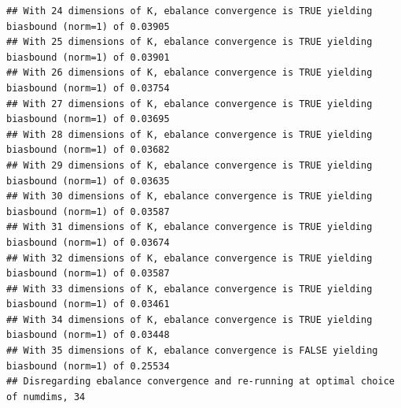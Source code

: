 \documentclass[
]{article}
\begin{document}
\begin{verbatim}
## With 24 dimensions of K, ebalance convergence is TRUE yielding biasbound (norm=1) of 0.03905  
## With 25 dimensions of K, ebalance convergence is TRUE yielding biasbound (norm=1) of 0.03901  
## With 26 dimensions of K, ebalance convergence is TRUE yielding biasbound (norm=1) of 0.03754  
## With 27 dimensions of K, ebalance convergence is TRUE yielding biasbound (norm=1) of 0.03695  
## With 28 dimensions of K, ebalance convergence is TRUE yielding biasbound (norm=1) of 0.03682  
## With 29 dimensions of K, ebalance convergence is TRUE yielding biasbound (norm=1) of 0.03635  
## With 30 dimensions of K, ebalance convergence is TRUE yielding biasbound (norm=1) of 0.03587  
## With 31 dimensions of K, ebalance convergence is TRUE yielding biasbound (norm=1) of 0.03674  
## With 32 dimensions of K, ebalance convergence is TRUE yielding biasbound (norm=1) of 0.03587  
## With 33 dimensions of K, ebalance convergence is TRUE yielding biasbound (norm=1) of 0.03461  
## With 34 dimensions of K, ebalance convergence is TRUE yielding biasbound (norm=1) of 0.03448  
## With 35 dimensions of K, ebalance convergence is FALSE yielding biasbound (norm=1) of 0.25534  
## Disregarding ebalance convergence and re-running at optimal choice of numdims, 34
\end{verbatim}
\end{document}
